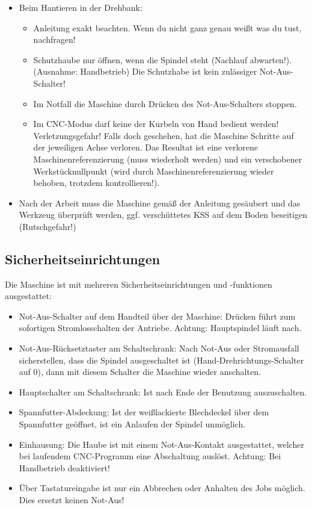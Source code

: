 \documentclass{\basedir/fablab-document}
\begin{document}
\begin{itemize}
 \item Beim Hantieren in der Drehbank:
\begin{itemize}
 \item Anleitung exakt beachten. Wenn du nicht ganz genau weißt was du tust, nachfragen!
 \item Schutzhaube nur öffnen, wenn die Spindel steht (Nachlauf abwarten!). (Ausnahme: Handbetrieb) Die Schutzhabe ist kein zulässiger Not-Aus-Schalter!
\item Im Notfall die Maschine durch Drücken des Not-Aus-Schalters stoppen.
\item Im CNC-Modus darf keine der Kurbeln von Hand bedient werden! Verletzungsgefahr! Falls doch geschehen, hat die Maschine Schritte auf der jeweiligen Achse verloren. Das Resultat ist eine verlorene Maschinenreferenzierung (muss wiederholt werden) und ein verschobener Werkstücknullpunkt (wird durch Maschinenreferenzierung wieder behoben, trotzdem kontrollieren!).
\end{itemize}
\item Nach der Arbeit muss die Maschine gemäß der Anleitung gesäubert und das Werkzeug überprüft werden, ggf. verschüttetes KSS auf dem Boden beseitigen (Rutschgefahr!)

\end{itemize}
\subsection{Sicherheitseinrichtungen}
Die Maschine ist mit mehreren Sicherheitseinrichtungen und -funktionen ausgestattet:
\begin{itemize}
	\item Not-Aus-Schalter auf dem Handteil über der Maschine: Drücken führt zum sofortigen Stromlosschalten der Antriebe. Achtung: Hauptspindel läuft nach.
	\item Not-Aus-Rücksetztaster am Schaltschrank: Nach Not-Aus oder Stromausfall sicherstellen, dass die Spindel ausgeschaltet ist (Hand-Drehrichtungs-Schalter auf 0), dann mit diesem Schalter die Maschine wieder anschalten.
	\item Hauptschalter am Schaltschrank: Ist nach Ende der Benutzung auszuschalten.
	\item Spannfutter-Abdeckung: Ist der weißlackierte Blechdeckel über dem Spannfutter geöffnet, ist ein Anlaufen der Spindel unmöglich.
	\item Einhausung: Die Haube ist mit einem Not-Aus-Kontakt ausgestattet, welcher bei laufendem CNC-Programm eine Abschaltung auslöst. Achtung: Bei Handbetrieb deaktiviert!
	\item Über Tastatureingabe ist nur ein Abbrechen oder Anhalten des Jobs möglich. Dies ersetzt keinen Not-Aus!
\end{itemize}
\end{document}
